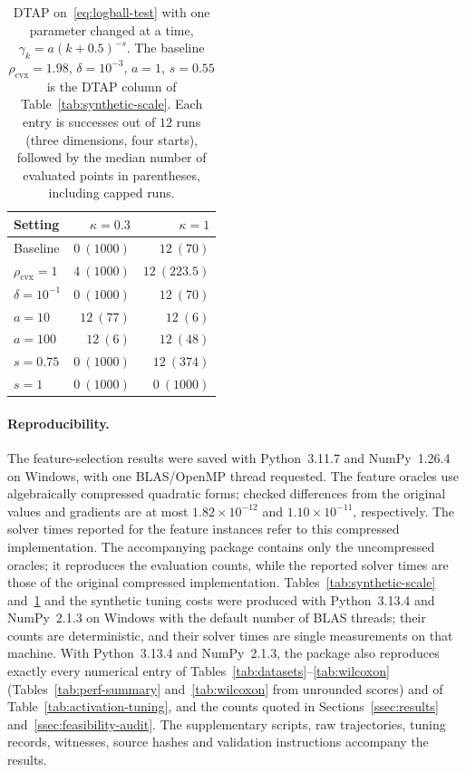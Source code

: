 \documentclass[]{interact}
\theoremstyle{plain}
\theoremstyle{definition}
\theoremstyle{remark}
\newcommand{\cvx}{\mathrm{cvx}}
\begin{document}
\begin{table}[t]
\centering\small
\setlength{\tabcolsep}{5pt}
\caption{DTAP on~\eqref{eq:logball-test} with one parameter changed at a time,
$\gamma_k=a(k+0.5)^{-s}$. The baseline $\rho_{\cvx}=1.98$, $\delta=10^{-3}$, $a=1$,
$s=0.55$ is the DTAP column of Table~\ref{tab:synthetic-scale}. Each entry is
successes out of $12$ runs (three dimensions, four starts), followed by the
median number of evaluated points in parentheses, including capped runs.}
\label{tab:dtap-sweep}
\begin{tabular}{@{}lrr@{}}
\toprule
Setting & $\kappa=0.3$ & $\kappa=1$\\
\midrule
Baseline & $0\ (1000)$ & $12\ (70)$\\
$\rho_{\cvx}=1$ & $4\ (1000)$ & $12\ (223.5)$\\
$\delta=10^{-1}$ & $0\ (1000)$ & $12\ (70)$\\
$a=10$ & $12\ (77)$ & $12\ (6)$\\
$a=100$ & $12\ (6)$ & $12\ (48)$\\
$s=0.75$ & $0\ (1000)$ & $12\ (374)$\\
$s=1$ & $0\ (1000)$ & $0\ (1000)$\\
\bottomrule
\end{tabular}
\end{table}

\paragraph*{Reproducibility.}
The feature-selection results were saved with Python~3.11.7 and NumPy~1.26.4
on Windows, with one BLAS/OpenMP thread requested. The feature oracles use algebraically
compressed quadratic forms; checked differences from the original
values and gradients are at most $1.82\times10^{-12}$ and
$1.10\times10^{-11}$, respectively. The solver times reported for the feature instances refer
to this compressed implementation. The accompanying package contains only the uncompressed
oracles; it reproduces the evaluation counts, while the reported solver times are those of
the original compressed implementation. Tables~\ref{tab:synthetic-scale}
and~\ref{tab:dtap-sweep} and the synthetic tuning costs were produced with
Python~3.13.4 and NumPy~2.1.3 on Windows with the default number of BLAS
threads; their counts are deterministic, and their solver times are single
measurements on that machine. With Python~3.13.4 and NumPy~2.1.3, the package also
reproduces exactly every numerical entry of Tables~\ref{tab:datasets}--\ref{tab:wilcoxon}
(Tables~\ref{tab:perf-summary} and~\ref{tab:wilcoxon} from unrounded scores) and of
Table~\ref{tab:activation-tuning}, and the counts quoted in Sections~\ref{ssec:results}
and~\ref{ssec:feasibility-audit}.
The supplementary scripts, raw trajectories, tuning records, witnesses,
source hashes and validation instructions accompany the results.
\end{document}
